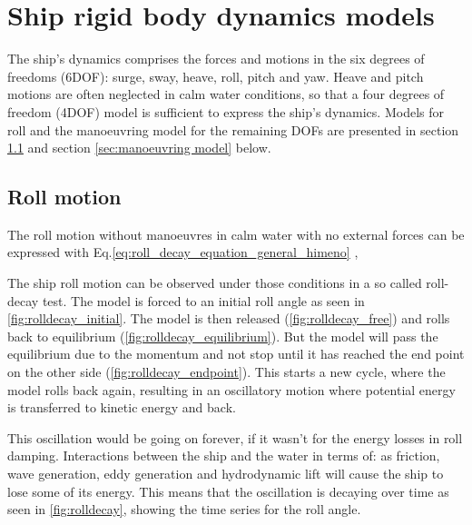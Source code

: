 \chapter{Ship rigid body dynamics models}
\label{ch:models}

The ship's dynamics comprises the forces and motions in the six degrees of freedoms (6DOF): surge, sway, heave, roll, pitch and yaw. Heave and pitch motions are often neglected in calm water conditions, so that a four degrees of freedom (4DOF) model is sufficient to express the ship's dynamics. Models for roll and the manoeuvring model for the remaining DOFs are presented in section \ref{sec:roll} and section \ref{sec:manoeuvring model} below. 

\section{Roll motion} \label{sec:roll}
The roll motion without manoeuvres in calm water with no external forces can be expressed with Eq.\ref{eq:roll_decay_equation_general_himeno} \cite{himeno_prediction_1981},

\noindent The ship roll motion can be observed under those conditions in a so called roll-decay test. The model is forced to an initial roll angle as seen in \autoref{fig:rolldecay_initial}. The model is then released (\autoref{fig:rolldecay_free}) and rolls back to equilibrium (\autoref{fig:rolldecay_equilibrium}). But the model will pass the equilibrium due to the momentum and not stop until it has reached the end point on the other side (\autoref{fig:rolldecay_endpoint}). This starts a new cycle, where the model rolls back again, resulting in an oscillatory motion where potential energy is transferred to kinetic energy and back.

\noindent This oscillation would be going on forever, if it wasn't for the energy losses in roll damping. Interactions between the ship and the water in terms of: as friction, wave generation, eddy generation and hydrodynamic lift will cause the ship to lose some of its energy. This means that the oscillation is decaying over time as seen in \autoref{fig:rolldecay}, showing the time series for the roll angle.


